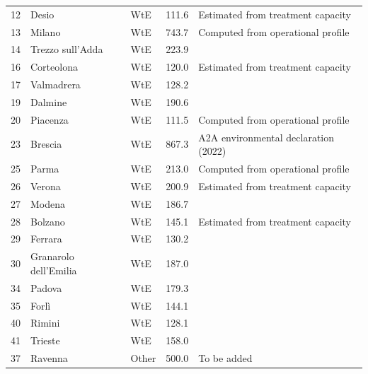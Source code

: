 \begin{table}[ht]
\begin{tabular}{rllrl}
12 & Desio & WtE & 111.6 & Estimated from treatment capacity \\
13 & Milano & WtE & 743.7 & Computed from operational profile \\
14 & Trezzo sull'Adda & WtE & 223.9 & \cite{} \\
16 & Corteolona & WtE & 120.0 & Estimated from treatment capacity \\
17 & Valmadrera & WtE & 128.2 & \cite{} \\
19 & Dalmine & WtE & 190.6 & \cite{} \\
20 & Piacenza & WtE & 111.5 & Computed from operational profile \\
23 & Brescia & WtE & 867.3 & A2A environmental declaration (2022) \\
25 & Parma & WtE & 213.0 & Computed from operational profile \\
26 & Verona & WtE & 200.9 & Estimated from treatment capacity \\
27 & Modena & WtE & 186.7 & \cite{} \\
28 & Bolzano & WtE & 145.1 & Estimated from treatment capacity \\
29 & Ferrara & WtE & 130.2 & \cite{} \\
30 & Granarolo dell'Emilia & WtE & 187.0 & \cite{} \\
34 & Padova & WtE & 179.3 & \cite{} \\
35 & Forlì & WtE & 144.1 & \cite{} \\
40 & Rimini & WtE & 128.1 & \cite{} \\
41 & Trieste & WtE & 158.0 & \cite{} \\
37 & Ravenna & Other & 500.0 & To be added \\
\hline
\end{tabular}
\end{table}
